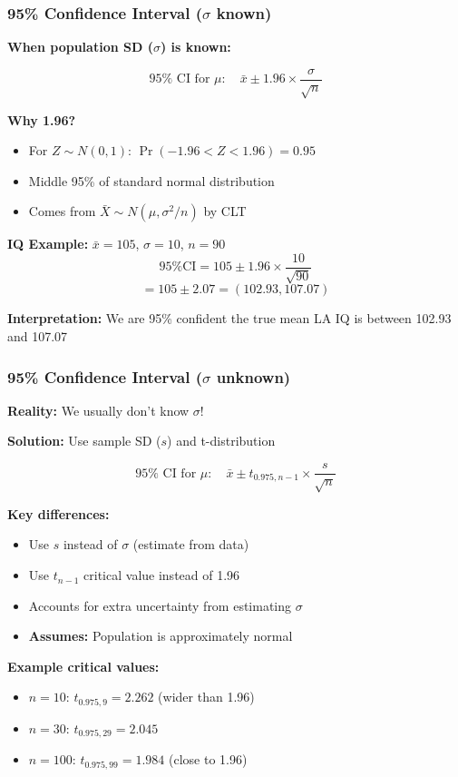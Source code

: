 \documentclass{beamer}
\begin{document}
\begin{frame}
\frametitle{95\% Confidence Interval ($\sigma$ known)}
\textbf{When population SD ($\sigma$) is known:}

$$95\% \text{ CI for } \mu: \quad \bar{x} \pm 1.96 \times \frac{\sigma}{\sqrt{n}}$$

\vspace{0.5cm}
\textbf{Why 1.96?}
\begin{itemize}
\item For $Z \sim N(0,1)$: $\Pr(-1.96 < Z < 1.96) = 0.95$
\item Middle 95\% of standard normal distribution
\item Comes from $\bar{X} \sim N(\mu, \sigma^2/n)$ by CLT
\end{itemize}

\vspace{0.5cm}
\textbf{IQ Example:} $\bar{x} = 105$, $\sigma = 10$, $n = 90$
$$\text{95\% CI} = 105 \pm 1.96 \times \frac{10}{\sqrt{90}}$$
$$= 105 \pm 2.07 = (102.93, 107.07)$$

\textbf{Interpretation:} We are 95\% confident the true mean LA IQ is between 102.93 and 107.07
\end{frame}

\begin{frame}
\frametitle{95\% Confidence Interval ($\sigma$ unknown)}
\textbf{Reality:} We usually don't know $\sigma$!

\vspace{0.3cm}
\textbf{Solution:} Use sample SD ($s$) and t-distribution

$$95\% \text{ CI for } \mu: \quad \bar{x} \pm t_{0.975, n-1} \times \frac{s}{\sqrt{n}}$$

\vspace{0.5cm}
\textbf{Key differences:}
\begin{itemize}
\item Use $s$ instead of $\sigma$ (estimate from data)
\item Use $t_{n-1}$ critical value instead of 1.96
\item Accounts for extra uncertainty from estimating $\sigma$
\item \textbf{Assumes:} Population is approximately normal
\end{itemize}

\vspace{0.5cm}
\textbf{Example critical values:}
\begin{itemize}
\item $n = 10$: $t_{0.975, 9} = 2.262$ (wider than 1.96)
\item $n = 30$: $t_{0.975, 29} = 2.045$
\item $n = 100$: $t_{0.975, 99} = 1.984$ (close to 1.96)
\end{itemize}
\end{frame}
\end{document}
